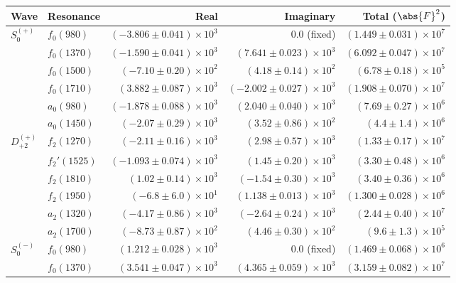 \begin{table}[ht]
    \begin{center}
        \begin{tabular}{llrrr}\toprule
        Wave & Resonance & Real & Imaginary & Total ($\abs{F}^2$) \\\midrule
$S_{0}^{(+)}$ & $f_{0}(980)$ & $(-3.806 \pm 0.041) \times 10^{3}$ & $0.0$ (fixed) & $(1.449 \pm 0.031) \times 10^{7}$ \\
 & $f_{0}(1370)$ & $(-1.590 \pm 0.041) \times 10^{3}$ & $(7.641 \pm 0.023) \times 10^{3}$ & $(6.092 \pm 0.047) \times 10^{7}$ \\
 & $f_{0}(1500)$ & $(-7.10 \pm 0.20) \times 10^{2}$ & $(4.18 \pm 0.14) \times 10^{2}$ & $(6.78 \pm 0.18) \times 10^{5}$ \\
 & $f_{0}(1710)$ & $(3.882 \pm 0.087) \times 10^{3}$ & $(-2.002 \pm 0.027) \times 10^{3}$ & $(1.908 \pm 0.070) \times 10^{7}$ \\
 & $a_{0}(980)$ & $(-1.878 \pm 0.088) \times 10^{3}$ & $(2.040 \pm 0.040) \times 10^{3}$ & $(7.69 \pm 0.27) \times 10^{6}$ \\
 & $a_{0}(1450)$ & $(-2.07 \pm 0.29) \times 10^{3}$ & $(3.52 \pm 0.86) \times 10^{2}$ & $(4.4 \pm 1.4) \times 10^{6}$ \\
$D_{+2}^{(+)}$ & $f_{2}(1270)$ & $(-2.11 \pm 0.16) \times 10^{3}$ & $(2.98 \pm 0.57) \times 10^{3}$ & $(1.33 \pm 0.17) \times 10^{7}$ \\
 & $f_{2}'(1525)$ & $(-1.093 \pm 0.074) \times 10^{3}$ & $(1.45 \pm 0.20) \times 10^{3}$ & $(3.30 \pm 0.48) \times 10^{6}$ \\
 & $f_{2}(1810)$ & $(1.02 \pm 0.14) \times 10^{3}$ & $(-1.54 \pm 0.30) \times 10^{3}$ & $(3.40 \pm 0.36) \times 10^{6}$ \\
 & $f_{2}(1950)$ & $(-6.8 \pm 6.0) \times 10^{1}$ & $(1.138 \pm 0.013) \times 10^{3}$ & $(1.300 \pm 0.028) \times 10^{6}$ \\
 & $a_{2}(1320)$ & $(-4.17 \pm 0.86) \times 10^{3}$ & $(-2.64 \pm 0.24) \times 10^{3}$ & $(2.44 \pm 0.40) \times 10^{7}$ \\
 & $a_{2}(1700)$ & $(-8.73 \pm 0.87) \times 10^{2}$ & $(4.46 \pm 0.30) \times 10^{2}$ & $(9.6 \pm 1.3) \times 10^{5}$ \\
$S_{0}^{(-)}$ & $f_{0}(980)$ & $(1.212 \pm 0.028) \times 10^{3}$ & $0.0$ (fixed) & $(1.469 \pm 0.068) \times 10^{6}$ \\
 & $f_{0}(1370)$ & $(3.541 \pm 0.047) \times 10^{3}$ & $(4.365 \pm 0.059) \times 10^{3}$ & $(3.159 \pm 0.082) \times 10^{7}$ \\

\end{tabular}
\end{center}
\end{table}
